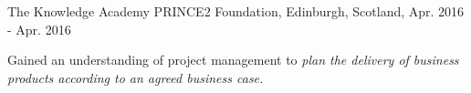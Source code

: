 \begin{cventries}
    \cventry
    {The Knowledge Academy} %
    {PRINCE2 Foundation, } %
    {Edinburgh, Scotland, } %
    {Apr. 2016 - Apr. 2016} %
    {
      \begin{cvitems} %
        \item {Gained an understanding of project management to \textit{plan the delivery of business products according to an agreed business case.}}
      \end{cvitems}
    }

\end{cventries}

\begin{comment}
  \cventry
    {Bonn International School} %
    {International Baccalaureate (IB)} %
    {Bonn, Germany} %
    {Sep. 2010 - May. 2012} %
    {
      \begin{cvitems} %
        \item {Took part in "Theory of Knowledge", learned to think critically.}
        \item {Learned time managment skills used for studying a broad change of subjects.
        \item {Conducted individual research experiment in Chemistry which resulted in an "extended essay".}
        \item {Immersed in a diverse culture.}
      \end{cvitems}
    }
\end{comment}

